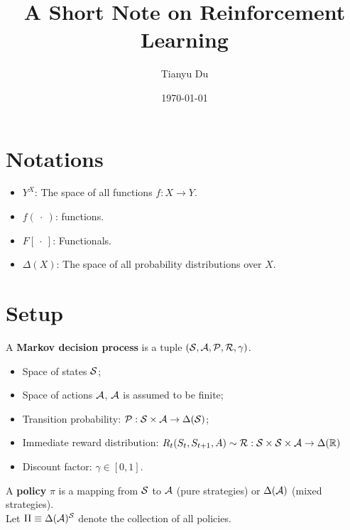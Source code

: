 \documentclass{article}
\title{A Short Note on Reinforcement Learning}
\author{Tianyu Du}
\date{\today}
\begin{document}
	\maketitle
	\section{Notations}
	\begin{itemize}
		\item $Y^X$: The space of all functions $f: X \to Y$.
		\item $f(\ \cdot\ )$: functions.
		\item $F[\ \cdot\ ]$: Functionals.
		\item $\Delta(X)$: The space of all probability distributions over $X$.
	\end{itemize}
	
	\section{Setup}
	\begin{definition}
		A \textbf{Markov decision process} is a tuple $(\mathcal{{S}}, \mathcal{{A}}, \mathcal{{P}}, \mathcal{{R}}, \gamma)$.
		\begin{itemize}
			\item Space of states $\mathcal{{S}}$;
			\item Space of actions $\mathcal{{A}}$, $\mathcal{{A}}$ is assumed to be finite;
			\item Transition probability: $\mathcal{{P}}: \mathcal{{S}} \times \mathcal{{A}} \to \Delta(\mathcal{{S}})$;
			\item Immediate reward distribution: $R_t(S_{t}, S_{t+1}, A) \sim \mathcal{{R}}: \mathcal{{S}} \times \mathcal{{S}} \times \mathcal{{A}} \to \Delta(\mathbb{R})$
			\item Discount factor: $\gamma \in [0, 1]$.
		\end{itemize}
	\end{definition}
	
	\begin{definition}
		A \textbf{policy} $\pi$ is a mapping from $\mathcal{{S}}$ to $\mathcal{{A}}$ (pure strategies) or $\Delta(\mathcal{{A}})$ (mixed strategies). \\
		Let $\Pi \equiv \Delta(\mathcal{{A}})^{\mathcal{{S}}}$ denote the collection of all policies.
	\end{definition}
	
\end{document}
